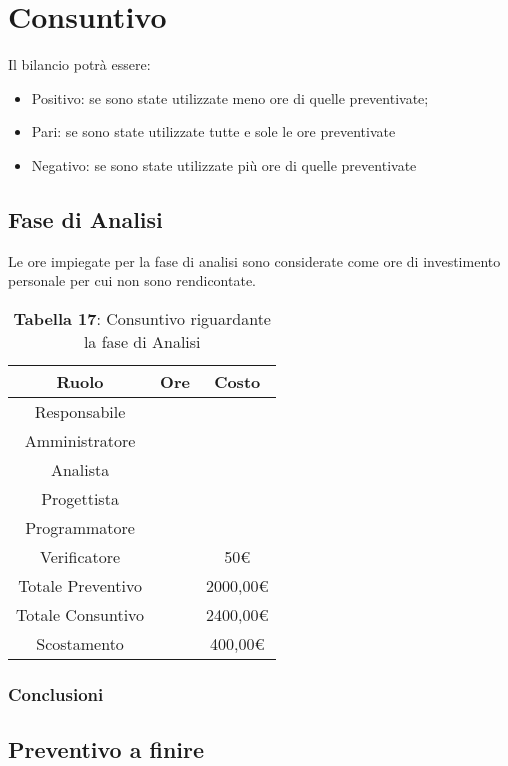 \section{Consuntivo}
Il bilancio potrà essere:
\begin{itemize}
	\item Positivo: se sono state utilizzate meno ore di quelle preventivate;
	\item Pari: se sono state utilizzate tutte e sole le ore preventivate
	\item Negativo: se sono state utilizzate più ore di quelle preventivate
\end{itemize}
\subsection{Fase di Analisi}
Le ore impiegate per la fase di analisi sono considerate come ore di investimento personale per cui non sono rendicontate.
\begin{table}[H]
	\centering
	\renewcommand{\arraystretch}{1.5}
	\begin{tabular}{|c|c|c|}
		\hline
		\rowcolor{lighter-grayer}
		Ruolo & Ore & Costo \\
		\hline
		Responsabile &  &  \\
		\hline
		Amministratore &  &  \\
		\hline
		Analista &  &  \\
		\hline
		Progettista&  &  \\
		\hline
		Programmatore &  &  \\
		\hline
		Verificatore &  & 50\euro \\
		\hline
		Totale Preventivo &  &  2000,00\euro \\
		\hline
		Totale Consuntivo &  &  2400,00\euro \\
		\hline
		Scostamento &  &  400,00\euro \\
		\hline
	\end{tabular}
	\caption*{\textbf{Tabella 17}: Consuntivo riguardante la fase di Analisi\\}
\end{table}
\subsubsection{Conclusioni}
\subsection{Preventivo a finire}
